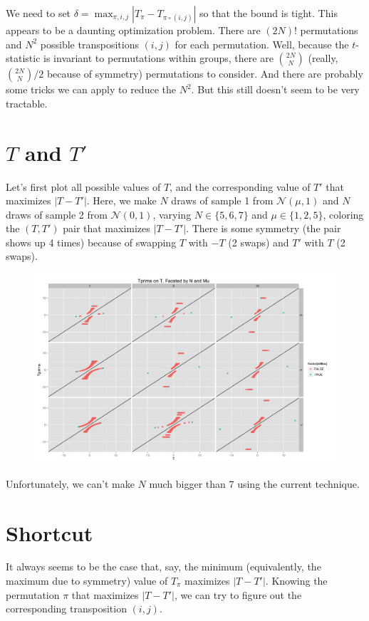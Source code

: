 We need to set $\delta = \max_{\pi, i, j} |T_{\pi} - T_{\pi \circ (i, j)}|$
so that the bound is tight.  This appears to be a daunting
optimization problem.  There are $(2N)!$ permutations and $N^2$
possible transpositions $(i, j)$ for each permutation.  Well, because the
$t$-statistic is invariant to permutations within groups, there are
$\binom{2N}{N}$ (really, $\binom{2N}{N} / 2$ because of symmetry)
permutations to consider.  And there are probably some tricks we can
apply to reduce the $N^2$.  But this still doesn't seem to be very
tractable.

\section{$T$ and $T'$}
Let's first plot all possible values of $T$, and the corresponding
value of $T'$ that maximizes $|T-T'|$.  Here, we make $N$ draws of
sample 1 from $\mathcal{N}(\mu, 1)$ and $N$ draws of sample 2 from
$\mathcal{N}(0, 1)$, varying $N \in \{5, 6, 7\}$ and $\mu \in \{1, 2,
5\}$, coloring the $(T, T')$ pair that maximizes $|T-T'|$.  There is
some symmetry (the pair shows up 4 times) because of swapping $T$ with
$-T$ (2 swaps) and $T'$ with $T$ (2 swaps).

\begin{figure}[!ht]
  \centering
  \includegraphics[scale=.12]{./simulations/better_bound_condition/t_tprime_plot.png}
\end{figure}

Unfortunately, we can't make $N$ much bigger than 7 using the current
technique.
\clearpage

\section{Shortcut}
It always seems to be the case that, say, the minimum (equivalently,
the maximum due to symmetry) value of $T_{\pi}$ maximizes $|T - T'|$.
Knowing the permutation $\pi$ that maximizes $|T - T'|$, we can try to
figure out the corresponding transposition $(i, j)$.

